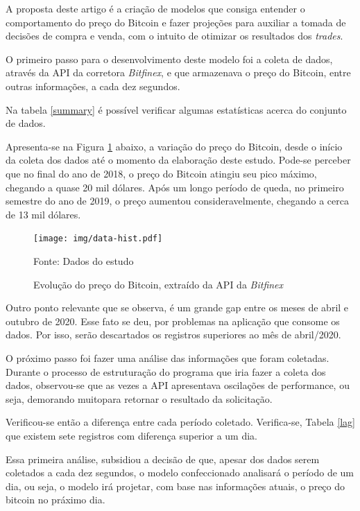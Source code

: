 \documentclass[12pt]{article}
\begin{document}
A proposta deste artigo é a criação de modelos que consiga entender o
comportamento do preço do Bitcoin e fazer projeções para auxiliar a tomada de
decisões de compra e venda, com o intuito de otimizar os resultados dos 
\textit{trades}.

O primeiro passo para o desenvolvimento deste modelo foi a coleta de dados, 
através da API da corretora \textit{Bitfinex}, e que armazenava o preço do 
Bitcoin, entre outras informações, a cada dez segundos.

Na tabela \ref{summary} é possível verificar algumas estatísticas acerca do 
conjunto de dados.



Apresenta-se na Figura \ref{fig:data-hist} abaixo, a variação do preço do 
Bitcoin, desde o início da coleta dos dados até o momento da elaboração deste 
estudo. Pode-se perceber que no final do ano de 2018, o preço do Bitcoin atingiu 
seu pico máximo, chegando a quase 20 mil dólares. Após um longo período de 
queda, no primeiro semestre do ano de 2019, o preço aumentou consideravelmente, 
chegando a cerca de 13 mil dólares.


\begin{figure}[ht]
  \centering
  \texttt{[image: img/data-hist.pdf]}
  \caption{Evolução do preço do Bitcoin, extraído da API da \textit{Bitfinex}}
  Fonte: Dados do estudo
  \label{fig:data-hist}
\end{figure}


Outro ponto relevante que se observa, é um grande gap entre os meses de 
abril e outubro de 2020. Esse fato se deu, por problemas na aplicação que 
consome os dados. Por isso, serão descartados os registros superiores ao mês 
de abril/2020.

O próximo passo foi fazer uma análise das informações que foram coletadas. 
Durante o processo de estruturação do programa que iria fazer a coleta dos 
dados, observou-se que as vezes a API apresentava oscilações de performance, 
ou seja, demorando muitopara retornar o resultado da solicitação.

Verificou-se então a diferença entre cada período coletado. Verifica-se,
Tabela \ref{lag} que existem sete registros com diferença superior a um dia. 



Essa primeira análise, subsidiou a decisão de que, apesar dos dados serem 
coletados a cada dez segundos, o modelo confeccionado analisará o período de 
um dia, ou seja, o modelo irá projetar, com base nas informações atuais, 
o preço do bitcoin no práximo dia.
\end{document}
